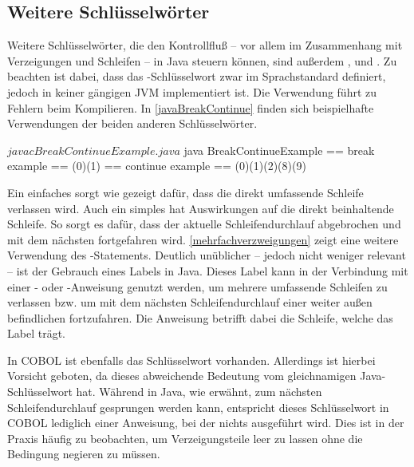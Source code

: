 
\subsection{Weitere Schlüsselwörter}

Weitere Schlüsselwörter, die den Kontrollfluß -- vor allem im Zusammenhang mit Verzeigungen und Schleifen -- in Java steuern können, sind außerdem ,  und . Zu beachten ist dabei, dass das -Schlüsselwort zwar im Sprachstandard definiert, jedoch in keiner gängigen JVM implementiert ist. Die Verwendung führt zu Fehlern beim Kompilieren. In \autoref{javaBreakContinue} finden sich beispielhafte Verwendungen der beiden anderen Schlüsselwörter.

\sepCodeAndOutputCheck
\begin{shellwindow}
$ javac BreakContinueExample.java 
$ java BreakContinueExample
== break example == 
(0)(1)
== continue example == 
(0)(1)(2)(8)(9)
\end{shellwindow}

Ein einfaches  sorgt wie gezeigt dafür, dass die direkt umfassende Schleife verlassen wird. Auch ein simples  hat Auswirkungen auf die direkt beinhaltende Schleife. So sorgt es dafür, dass der aktuelle Schleifendurchlauf abgebrochen und mit dem nächsten fortgefahren wird. \autoref{mehrfachverzweigungen} zeigt eine weitere Verwendung des -Statements. Deutlich unüblicher -- jedoch nicht weniger relevant -- ist der Gebrauch eines Labels in Java. Dieses Label kann in der Verbindung mit einer - oder -Anweisung genutzt werden, um mehrere umfassende Schleifen zu verlassen bzw. um mit dem nächsten Schleifendurchlauf einer weiter außen befindlichen fortzufahren. Die Anweisung betrifft dabei die Schleife, welche das Label trägt. 

In COBOL ist ebenfalls das Schlüsselwort  vorhanden. Allerdings ist hierbei Vorsicht geboten, da dieses abweichende Bedeutung vom gleichnamigen Java-Schlüsselwort hat. Während in Java, wie erwähnt, zum nächsten Schleifendurchlauf gesprungen werden kann, entspricht dieses Schlüsselwort in COBOL lediglich einer Anweisung, bei der nichts ausgeführt wird. Dies ist in der Praxis häufig zu beobachten, um \zB Verzeigungsteile leer zu lassen ohne die Bedingung negieren zu müssen.

